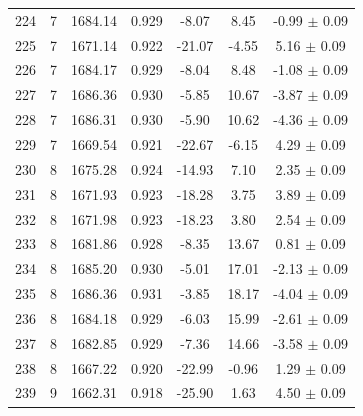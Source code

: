 \begin{longtable}{c c c c c c c}
    224 & 7 & 1684.14 & 0.929 & \cellcolor{aiclightgreen}-8.07 & \cellcolor{aiclightred}8.45 & -0.99 $\pm$ 0.09 \\
    225 & 7 & 1671.14 & 0.922 & \cellcolor{aicgreen}-21.07 & \cellcolor{aicyellow}-4.55 & \cellcolor{aicgreen}5.16 $\pm$ 0.09 \\
    226 & 7 & 1684.17 & 0.929 & \cellcolor{aiclightgreen}-8.04 & \cellcolor{aiclightred}8.48 & \cellcolor{aicorange}-1.08 $\pm$ 0.09 \\
    227 & 7 & 1686.36 & 0.930 & \cellcolor{aicyellow}-5.85 & \cellcolor{aicred}10.67 & \cellcolor{aiclightred}-3.87 $\pm$ 0.09 \\
    228 & 7 & 1686.31 & 0.930 & \cellcolor{aicyellow}-5.90 & \cellcolor{aicred}10.62 & \cellcolor{aiclightred}-4.36 $\pm$ 0.09 \\
    229 & 7 & 1669.54 & 0.921 & \cellcolor{aicgreen}-22.67 & \cellcolor{aiclightgreen}-6.15 & \cellcolor{aiclightgreen}4.29 $\pm$ 0.09 \\
    230 & 8 & 1675.28 & 0.924 & \cellcolor{aicgreen}-14.93 & \cellcolor{aiclightred}7.10 & \cellcolor{aicyellow}2.35 $\pm$ 0.09 \\
    231 & 8 & 1671.93 & 0.923 & \cellcolor{aicgreen}-18.28 & \cellcolor{aiclightorange}3.75 & \cellcolor{aiclightgreen}3.89 $\pm$ 0.09 \\
    232 & 8 & 1671.98 & 0.923 & \cellcolor{aicgreen}-18.23 & \cellcolor{aiclightorange}3.80 & \cellcolor{aicyellow}2.54 $\pm$ 0.09 \\
    233 & 8 & 1681.86 & 0.928 & \cellcolor{aiclightgreen}-8.35 & \cellcolor{aicred}13.67 & 0.81 $\pm$ 0.09 \\
    234 & 8 & 1685.20 & 0.930 & \cellcolor{aicyellow}-5.01 & \cellcolor{aicred}17.01 & \cellcolor{aicorange}-2.13 $\pm$ 0.09 \\
    235 & 8 & 1686.36 & 0.931 & \cellcolor{aiclightyellow}-3.85 & \cellcolor{aicred}18.17 & \cellcolor{aiclightred}-4.04 $\pm$ 0.09 \\
    236 & 8 & 1684.18 & 0.929 & \cellcolor{aicyellow}-6.03 & \cellcolor{aicred}15.99 & \cellcolor{aicorange}-2.61 $\pm$ 0.09 \\
    237 & 8 & 1682.85 & 0.929 & \cellcolor{aiclightgreen}-7.36 & \cellcolor{aicred}14.66 & \cellcolor{aiclightred}-3.58 $\pm$ 0.09 \\
    238 & 8 & 1667.22 & 0.920 & \cellcolor{aicgreen}-22.99 & -0.96 & \cellcolor{aicyellow}1.29 $\pm$ 0.09 \\
    239 & 9 & 1662.31 & 0.918 & \cellcolor{aicgreen}-25.90 & 1.63 & \cellcolor{aiclightgreen}4.50 $\pm$ 0.09 \\

\end{longtable}
